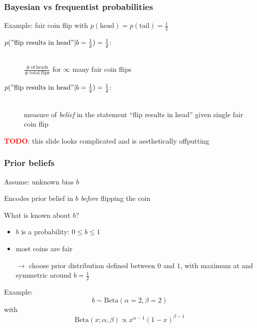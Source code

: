 \documentclass[t,aspectratio=169]{beamer}
\newcommand{\todo}{\textcolor{red}{\textbf{TODO}}}
\begin{document}
\begin{frame}
  \frametitle{Bayesian vs frequentist probabilities}
  Example: fair coin flip with $p(\mathrm{head}) = p(\mathrm{tail}) = \frac{1}{2}$
  \begin{tcolorbox}[title=Frequentist probability]
    \begin{description}
    \item[$p(\mathrm{"flip\ results\ in\ head"}|b=\frac{1}{2})=\frac{1}{2}$:] \hfill \\ $\frac{\mathrm{\# \ of \ heads}}{\mathrm{\# \ total \ flips}}$ for $\infty$ many fair coin flips
    \end{description}
  \end{tcolorbox}
  \begin{tcolorbox}[title=Bayesian probability]
    \begin{description}
    \item[$p(\mathrm{"flip\ results\ in\ head"}|b=\frac{1}{2})=\frac{1}{2}$:] \hfill \\ measure of \textit{belief} in the statement ``flip results in head'' given single fair coin flip
    \end{description}
  \end{tcolorbox}
  \todo: this slide looks complicated and is aesthetically offputting
\end{frame}


\begin{frame}
  \frametitle{Prior beliefs}
  Assume: unknown bias $b$
  \begin{tcolorbox}[title=Prior probability]
    Encodes prior belief in $b$ \textit{before} flipping the coin
  \end{tcolorbox}
  What is known about $b$?
  \begin{itemize}
  \item $b$ is a probability: $0 \leq b \leq 1$
  \item most coins are fair
  \end{itemize}
  \begin{itemize}
  \item[$\rightarrow$] choose prior distribution defined between $0$ and $1$, with maximum at and symmetric around $b=\frac{1}{2}$
  \end{itemize}
  Example:
  \begin{equation*}
    b \sim \mathrm{Beta}(\alpha=2,\beta=2)
  \end{equation*}
  with
  \begin{equation*}
    \mathrm{Beta}(x;\alpha, \beta) \propto x^{\alpha-1}(1-x)^{\beta-1}
  \end{equation*}
\end{frame}
\end{document}

